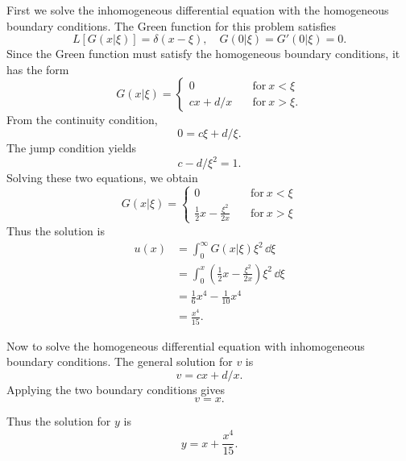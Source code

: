 {\begin{Solution}
  First we solve the inhomogeneous differential equation with the homogeneous
  boundary conditions.  The Green function for this problem satisfies
  \[ L[G(x|\xi)] = \delta(x-\xi), \quad G(0|\xi) = G'(0|\xi) = 0. \]
  Since the Green function must satisfy the
  homogeneous boundary conditions, it has the form
  \[ G(x|\xi) = 
  \begin{cases}
    0 \quad &\mathrm{for}\ x < \xi \\
    c x + d/x \quad &\mathrm{for}\ x > \xi.
  \end{cases}
  \]
  From the continuity condition,
  \[ 0 = c \xi + d / \xi.\]
  The jump condition yields
  \[ c - d/ \xi^2 = 1.\]
  Solving these two equations, we obtain
  \[ G(x|\xi) = 
  \begin{cases}
    0 \quad &\mathrm{for}\ x < \xi \\
    \frac{1}{2} x - \frac{\xi^2}{2 x} \quad &\mathrm{for}\ x > \xi
  \end{cases}
  \]
  Thus the solution is
  \begin{align*}
    u(x)    &= \int_0^\infty G(x|\xi) \xi^2\,\dd \xi \\
    &= \int_0^x \left(\frac{1}{2} x - \frac{\xi^2}{2 x}\right)\xi^2\,\dd \xi\\
    &= \frac{1}{6}x^4 - \frac{1}{10}x^4 \\
    &= \frac{x^4}{15}.
  \end{align*}

  Now to solve the homogeneous differential equation with inhomogeneous 
  boundary conditions.
  The general solution for $v$ is
  \[ v = c x + d / x. \]
  Applying the two boundary conditions gives
  \[ v = x.\]

  Thus the solution for $y$ is
  \[ \boxed{y = x + \frac{x^4}{15}.} \]
\end{Solution}












}
